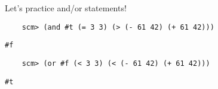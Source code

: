 \begin{blocksection}
Let's practice and/or statements!

\begin{lstlisting}
    scm> (and #t (= 3 3) (> (- 61 42) (+ 61 42)))
\end{lstlisting}
\begin{solution}[.25in]
    \texttt{#f}
\end{solution}

\begin{lstlisting}
    scm> (or #f (< 3 3) (< (- 61 42) (+ 61 42)))
\end{lstlisting}
\begin{solution}[.25in]
    \texttt{#t}
\end{solution}
\end{blocksection}